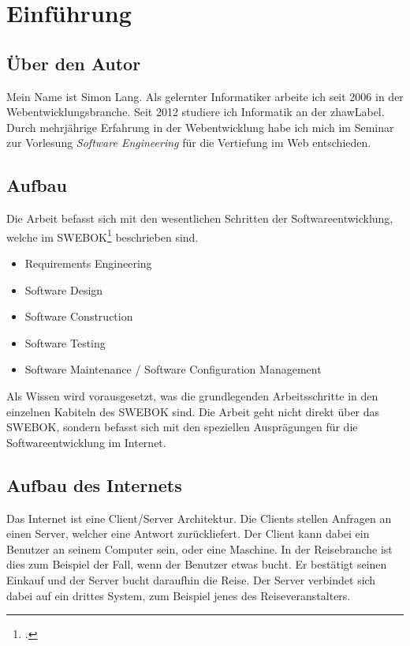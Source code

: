 \chapter{Einführung}
\label{sec:einfuehrung}

\section{Über den Autor}
\label{sec:einfuehrung:autor}
Mein Name ist Simon Lang. Als gelernter Informatiker arbeite ich seit 2006 in der Webentwicklungsbranche.
Seit 2012 studiere ich Informatik an der \Gls{zhawLabel}.
Durch mehrjährige Erfahrung in der Webentwicklung habe ich mich im Seminar zur Vorlesung \textit{Software Engineering} für die Vertiefung im Web entschieden.

\section{Aufbau}
Die Arbeit befasst sich mit den wesentlichen Schritten der Softwareentwicklung, welche im SWEBOK\footcite{IEEE_Computer_Society_2015-05-30} beschrieben sind.
\begin{itemize}
\item Requirements Engineering
\item Software Design
\item Software Construction
\item Software Testing
\item Software Maintenance / Software Configuration Management
\end{itemize}

Als Wissen wird vorausgesetzt, was die grundlegenden Arbeitsschritte in den einzelnen Kabiteln des SWEBOK sind. Die Arbeit geht nicht direkt über das SWEBOK, sondern befasst sich mit den speziellen Ausprägungen für die Softwareentwicklung im Internet.

\section{Aufbau des Internets}
Das Internet ist eine Client/Server Architektur. Die Clients stellen Anfragen an einen Server, welcher eine Antwort zurückliefert. Der Client kann dabei ein Benutzer an seinem Computer sein, oder eine Maschine. In der Reisebranche ist dies zum Beispiel der Fall, wenn der Benutzer etwas bucht. Er bestätigt seinen Einkauf und der Server bucht daraufhin die Reise. Der Server verbindet sich dabei auf ein drittes System, zum Beispiel jenes des Reiseveranstalters. 

